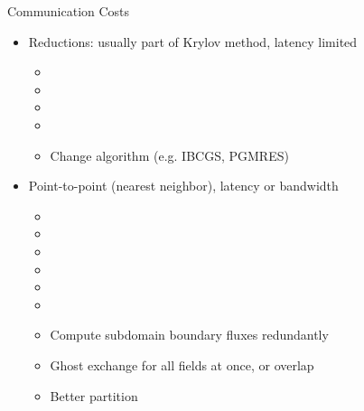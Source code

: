\begin{frame}{Communication Costs}
  \begin{itemize}
  \item Reductions: usually part of Krylov method, latency limited
    \begin{itemize}
    \item {}
    \item {}
    \item {}
    \item {}
    \item Change algorithm (e.g. IBCGS, PGMRES)
    \end{itemize}
  \item Point-to-point (nearest neighbor), latency or bandwidth
    \begin{itemize}
    \item {}
    \item {}
    \item {}
    \item {}
    \item {}
    \item {}
    \item Compute subdomain boundary fluxes redundantly
    \item Ghost exchange for all fields at once, or overlap
    \item Better partition
    \end{itemize}
  \end{itemize}
\end{frame}
